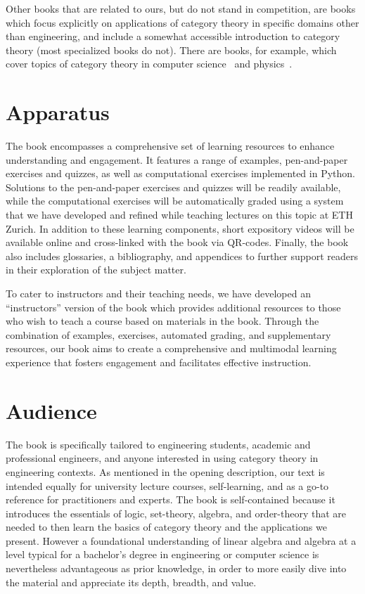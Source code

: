 \documentclass[10pt, article, one side]{memoir}
\begin{document}
    Other books that are related to ours, but do not stand in competition, are books which focus explicitly on applications of category theory in specific domains other than engineering, and include a somewhat accessible introduction to category theory (most specialized books do not).
    There are books, for example, which cover topics of category theory in computer science~\cite{BarrWells,Milewski,Pierce} and physics~\cite{CoeckeKisssinger}.

    \section{Apparatus}
    The book encompasses a comprehensive set of learning resources to enhance understanding and engagement.
    It features a range of examples, pen-and-paper exercises and quizzes, as well as computational exercises implemented in Python.
    Solutions to the pen-and-paper exercises and quizzes will be readily available, while the computational exercises will be automatically graded using a system that we have developed and refined while teaching lectures on this topic at ETH Zurich.
    In addition to these learning components, short expository videos will be available online and cross-linked with the book via QR-codes.
    Finally, the book also includes glossaries, a bibliography, and appendices to further support readers in their exploration of the subject matter.

    To cater to instructors and their teaching needs, we have developed an ``instructors'' version of the book which provides additional resources to those who wish to teach a course based on materials in the book.
    Through the combination of examples, exercises, automated grading, and supplementary resources, our book aims to create a comprehensive and multimodal learning experience that fosters engagement and facilitates effective instruction.

    \section{Audience}
    The book is specifically tailored to engineering students, academic and professional engineers, and anyone interested in using category theory in engineering contexts.
    As mentioned in the opening description, our text is intended equally for university lecture courses, self-learning, and as a go-to reference for practitioners and experts.
    The book is self-contained because it introduces the essentials of logic, set-theory, algebra, and order-theory that are needed to then learn the basics of category theory and the applications we present.
    However a foundational understanding of linear algebra and algebra at a level typical for a bachelor's degree in engineering or computer science is nevertheless advantageous as prior knowledge, in order to more easily dive into the material and appreciate its depth, breadth, and value.
\end{document}
